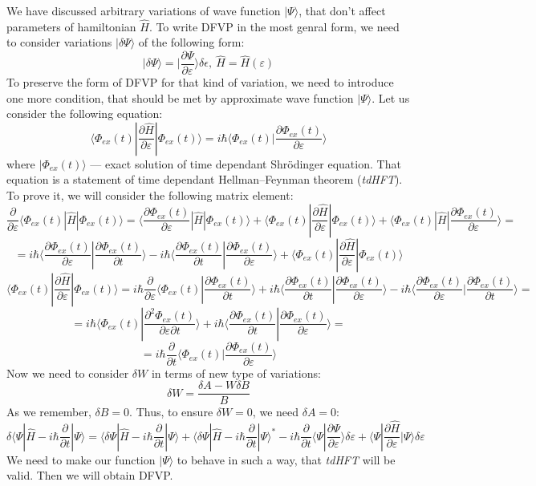 We have discussed arbitrary variations of wave function $|\Psi\rangle$, that don't affect parameters of hamiltonian $\hat{H}$.
To write DFVP in the most genral form, we need to consider variations $|\delta\Psi\rangle$ of the following form:
$$|\delta\Psi\rangle=|\frac{\partial\Psi}{\partial\varepsilon}\rangle\delta\epsilon,\ \hat{H}=\hat{H}(\varepsilon)$$
To preserve the form of DFVP for that kind of variation, we need to introduce one more condition, 
that should be met by approximate wave function $|\Psi\rangle$.
Let us consider the following equation:
$$\langle\Phi_{ex}(t)|\frac{\partial\hat{H}}{\partial\varepsilon}|\Phi_{ex}(t)\rangle = %
  i\hbar\langle\Phi_{ex}(t)|\frac{\partial\Phi_{ex}(t)}{\partial\varepsilon}\rangle$$
where $|\Phi_{ex}(t)\rangle$ --- exact solution of time dependant Shr\"{o}dinger equation.
That equation is a statement of time dependant Hellman--Feynman theorem (\textit{tdHFT}). 
To prove it, we will consider the following matrix element:
$$\frac{\partial}{\partial\varepsilon}\langle\Phi_{ex}(t)|\hat{H}|\Phi_{ex}(t)\rangle=%
				      \langle\frac{\partial\Phi_{ex}(t)}{\partial\varepsilon}|\hat{H}|\Phi_{ex}(t)\rangle+%
				      \langle\Phi_{ex}(t)|\frac{\partial\hat{H}}{\partial\varepsilon}|\Phi_{ex}(t)\rangle+%
				      \langle\Phi_{ex}(t)|\hat{H}|\frac{\partial\Phi_{ex}(t)}{\partial\varepsilon}\rangle=$$
$$=i\hbar\langle\frac{\partial\Phi_{ex}(t)}{\partial\varepsilon}|\frac{\partial\Phi_{ex}(t)}{\partial t}\rangle-%
   i\hbar\langle\frac{\partial\Phi_{ex}(t)}{\partial t}|\frac{\partial\Phi_{ex}(t)}{\partial\varepsilon}\rangle+
   \langle\Phi_{ex}(t)|\frac{\partial\hat{H}}{\partial\varepsilon}|\Phi_{ex}(t)\rangle$$
$$\langle\Phi_{ex}(t)|\frac{\partial\hat{H}}{\partial\varepsilon}|\Phi_{ex}(t)\rangle=%
  i\hbar\frac{\partial}{\partial\varepsilon}\langle\Phi_{ex}(t)|\frac{\partial\Phi_{ex}(t)}{\partial t}\rangle+%
  i\hbar\langle\frac{\partial\Phi_{ex}(t)}{\partial t}|\frac{\partial\Phi_{ex}(t)}{\partial\varepsilon}\rangle-%
  i\hbar\langle\frac{\partial\Phi_{ex}(t)}{\partial\varepsilon}|\frac{\partial\Phi_{ex}(t)}{\partial t}\rangle=$$
$$=i\hbar\langle\Phi_{ex}(t)|\frac{\partial^2\Phi_{ex}(t)}{\partial\varepsilon\partial t}\rangle+%
   i\hbar\langle\frac{\partial\Phi_{ex}(t)}{\partial t}|\frac{\partial\Phi_{ex}(t)}{\partial\varepsilon}\rangle=$$
$$=i\hbar\frac{\partial}{\partial t}\langle\Phi_{ex}(t)|\frac{\partial\Phi_{ex}(t)}{\partial\varepsilon}\rangle$$
Now we need to consider $\delta W$ in terms of new type of variations:
$$\delta W = \frac{\delta A - W\delta B}{B}$$
As we remember, $\delta B = 0$. Thus, to ensure $\delta W = 0$, we need $\delta A = 0$:
$$\delta\langle\Psi|\hat{H}-i\hbar\frac{\partial}{\partial t}|\Psi\rangle=%
	\langle\delta\Psi|\hat{H}-i\hbar\frac{\partial}{\partial t}|\Psi\rangle + %
	\langle\delta\Psi|\hat{H}-i\hbar\frac{\partial}{\partial t}|\Psi\rangle^*-%
	i\hbar\frac{\partial}{\partial t}\langle\Psi|\frac{\partial\Psi}{\partial\varepsilon}\rangle\delta\varepsilon+%
	\langle\Psi|\frac{\partial\hat{H}}{\partial\varepsilon}|\Psi\rangle\delta\varepsilon
	$$
We need to make our function $|\Psi\rangle$ to behave in such a way, 
that \textit{tdHFT} will be valid. 
Then we will obtain DFVP.
